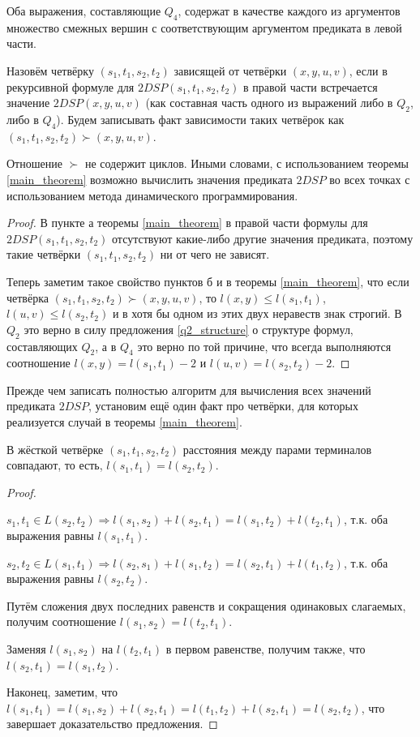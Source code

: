 \begin{proposition}
Оба выражения, составляющие $Q_4$, содержат в качестве каждого из аргументов множество смежных вершин с соответствующим аргументом предиката в левой части. 
\end{proposition}

Назовём четвёрку $(s_1, t_1, s_2, t_2)$ зависящей от четвёрки $(x, y, u, v)$, если в рекурсивной формуле для $2DSP(s_1, t_1, s_2, t_2)$ в правой части встречается значение $2DSP(x, y, u, v)$ (как составная часть одного из выражений либо в $Q_2$, либо в $Q_4$). Будем записывать факт зависимости таких четвёрок как $(s_1, t_1, s_2, t_2) \succ (x, y, u, v)$.

\begin{proposition}
Отношение $\succ$ не содержит циклов. Иными словами, с использованием теоремы \ref{main_theorem} возможно вычислить значения предиката $2DSP$ во всех точках с использованием метода динамического программирования.
\end{proposition}
\begin{proof}
В пункте а теоремы \ref{main_theorem} в правой части формулы для $2DSP(s_1, t_1, s_2, t_2)$ отсутствуют какие-либо другие значения предиката, поэтому такие четвёрки $(s_1, t_1, s_2, t_2)$ ни от чего не зависят.

Теперь заметим такое свойство пунктов б и в теоремы \ref{main_theorem}, что если четвёрка $(s_1, t_1, s_2, t_2) \succ (x, y, u, v)$, то $l(x, y) \leq l(s_1, t_1)$, $l(u, v) \leq l(s_2, t_2)$ и в хотя бы одном из этих двух неравеств знак строгий. В $Q_2$ это верно в силу предложения \ref{q2_structure} о структуре формул, составляющих $Q_2$, а в $Q_4$ это верно по той причине, что всегда выполняются соотношение $l(x, y) = l(s_1, t_1) - 2$ и $l(u, v) = l(s_2, t_2) - 2$.
\end{proof}

Прежде чем записать полностью алгоритм для вычисления всех значений предиката $2DSP$, установим ещё один факт про четвёрки, для которых реализуется случай в теоремы \ref{main_theorem}.

\begin{proposition} \label{eql}
В жёсткой четвёрке $(s_1, t_1, s_2, t_2)$ расстояния между парами терминалов совпадают, то есть, $l(s_1, t_1) = l(s_2, t_2)$.
\end{proposition}
\begin{proof} ~

$s_1, t_1 \in L(s_2, t_2) \Rightarrow l(s_1, s_2) + l(s_2, t_1) = l(s_1, t_2) + l(t_2, t_1)$, т.к. оба выражения равны $l(s_1, t_1)$.

$s_2, t_2 \in L(s_1, t_1) \Rightarrow l(s_2, s_1) + l(s_1, t_2) = l(s_2, t_1) + l(t_1, t_2)$, т.к. оба выражения равны $l(s_2, t_2)$.

Путём сложения двух последних равенств и сокращения одинаковых слагаемых, получим соотношение $l(s_1, s_2) = l(t_2, t_1)$. 

Заменяя $l(s_1, s_2)$ на $l(t_2, t_1)$ в первом равенстве, получим также, что $l(s_2, t_1) = l(s_1, t_2)$.

Наконец, заметим, что $l(s_1, t_1) = l(s_1, s_2) + l(s_2, t_1) = l(t_1, t_2) + l(s_2, t_1) = l(s_2, t_2)$, что завершает доказательство предложения.
\end{proof}

